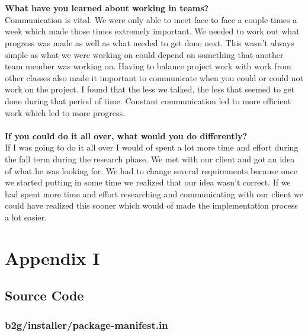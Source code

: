 \documentclass[12pt]{article}
\begin{document}
\\\\
\textbf{What have you learned about working in teams?}\\
Communication is vital. We were only able to meet face to face a couple times a week which made those times extremely important. We needed to work out what progress was made as well as what needed to get done next.  This wasn't always simple as what we were working on could depend on something that another team member was working on.  Having to balance project work with work from other classes also made it important to communicate when you could or could not work on the project.  I found that the less we talked, the less that seemed to get done during that period of time.  Constant communication led to more efficient work which led to more progress.   
\\\\
\textbf{If you could do it all over, what would you do differently?}\\
If I was going to do it all over I would of spent a lot more time and effort during the fall term during the research phase.  We met with our client and got an idea of what he was looking for. We had to change several requirements because once we started putting in some time we realized that our idea wasn't correct.  If we had spent more time and effort researching and communicating with our client we could have realized this sooner which would of made the implementation process a lot easier.  
\pagebreak

\section{Appendix I}
\subsection{Source Code}

\subsubsection{b2g/installer/package-manifest.in}

\pagebreak
\end{document}
